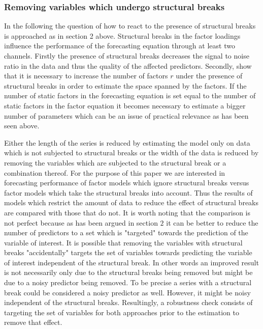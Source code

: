 \documentclass[12pt]{article}
\begin{document}
\subsubsection{Removing variables which undergo structural breaks}

In the following the question of how to react to the presence of structural breaks is approached as in section 2 above. Structural breaks in the factor loadings influence the performance of the forecasting equation through at least two channels. Firstly the presence of structural breaks decreases the signal to noise ratio in the data and thus the quality of the affected predictors. Secondly, \citet{breitung2011testing} show that it is necessary to increase the number of factors $r$ under the presence of structural breaks in order to estimate the space spanned by the factors. If the number of static factors in the forecasting equation is set equal to the number of static factors in the factor equation it becomes necessary to estimate a bigger number of parameters which can be an issue of practical relevance as has been seen above.


Either the length of the series is reduced by estimating the model only on data which is not subjected to structural breaks or the width of the data is reduced by removing the variables which are subjected to the structural break or a combination thereof. For the purpose of this paper we are interested in forecasting performance of factor models which ignore structural breaks versus factor models which take the structural breaks into account. Thus the results of models which restrict the amount of data to reduce the effect of structural breaks are compared with those that do not. It is worth noting that the comparison is not perfect because as has been argued in section $2$ it can be better to reduce the number of predictors to a set which is "targeted" towards the prediction of the variable of interest. It is possible that removing the variables with structural breaks "accidentally" targets the set of variables towards predicting the variable of interest independent of the structural break. In other words an improved result is not necessarily only due to the structural breaks being removed but might be due to a noisy predictor being removed. To be precise a series with a structural break could be considered a noisy predictor as well. However, it might be noisy independent of the structural breaks.
Resultingly, a robustness check consists of targeting the set of variables for both approaches prior to the estimation to remove that effect.
\end{document}
